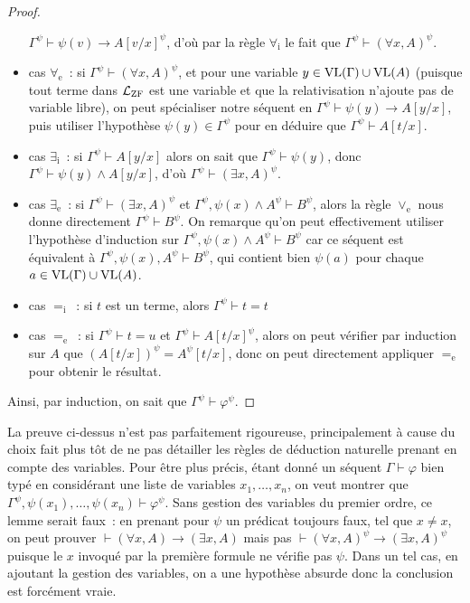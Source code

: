 \begin{proof}
\begin{itemize}
    $\Gamma^\psi\vdash \psi(v)\to A[v/x]^\psi$, d'où par la règle
    $\forall_\mathrm i$ le fait que $\Gamma^\psi \vdash (\forall x, A)^\psi$.
  \item cas $\forall_\mathrm e$~: si $\Gamma^\psi \vdash (\forall x,A)^\psi$, et
    pour une variable $y \in \operatorname{VL}(\Gamma)\cup \operatorname{VL}(A)$ (puisque tout terme dans
    $\mathcal L_{\operatorname{ZF}}$ est une variable et que la relativisation n'ajoute pas
    de variable libre), on peut spécialiser notre séquent en
    $\Gamma^\psi \vdash \psi(y)\to A[y/x]$, puis utiliser l'hypothèse
    $\psi(y)\in\Gamma^\psi$ pour en déduire que $\Gamma^\psi \vdash A[t/x]$.
  \item cas $\exists_\mathrm i$~: si $\Gamma^\psi \vdash A[y/x]$ alors on sait
    que $\Gamma^\psi\vdash \psi(y)$, donc
    $\Gamma^\psi\vdash \psi(y)\land A[y/x]$, d'où
    $\Gamma^\psi \vdash (\exists x, A)^\psi$.
  \item cas $\exists_\mathrm e$~: si $\Gamma^\psi \vdash (\exists x, A)^\psi$ et
    $\Gamma^\psi, \psi(x) \land A^\psi \vdash B^\psi$, alors la règle
    $\lor_\mathrm e$ nous donne directement $\Gamma^\psi \vdash B^\psi$. On
    remarque qu'on peut effectivement utiliser l'hypothèse d'induction sur
    $\Gamma^\psi, \psi(x)\land A^\psi\vdash B^\psi$ car ce séquent est équivalent
    à $\Gamma^\psi, \psi(x), A^\psi \vdash B^\psi$, qui contient bien $\psi(a)$
    pour chaque $a \in \operatorname{VL}(\Gamma)\cup\operatorname{VL}(A)$.
  \item cas $=_\mathrm i$~: si $t$ est un terme, alors $\Gamma^\psi\vdash t = t$
  \item cas $=_\mathrm e$~: si $\Gamma^\psi \vdash t = u$ et
    $\Gamma^\psi \vdash A[t/x]^\psi$, alors on peut vérifier par induction sur
    $A$ que $(A[t/x])^\psi = A^\psi [t/x]$, donc on peut directement appliquer
    $=_\mathrm e$ pour obtenir le résultat.
  \end{itemize}
  Ainsi, par induction, on sait que $\Gamma^\psi \vdash \varphi^\psi$.
\end{proof}

\begin{remark}
  La preuve ci-dessus n'est pas parfaitement rigoureuse, principalement à cause
  du choix fait plus tôt de ne pas détailler les règles de déduction naturelle
  prenant en compte des variables. Pour être plus précis, étant donné un séquent
  $\Gamma\vdash \varphi$ bien typé en considérant une liste de variables
  $x_1,\ldots,x_n$, on veut montrer que
  $\Gamma^\psi, \psi(x_1),\ldots,\psi(x_n) \vdash \varphi^\psi$. Sans gestion des
  variables du premier ordre, ce lemme serait faux~: en prenant pour $\psi$ un
  prédicat toujours faux, tel que $x\neq x$, on peut prouver
  $\vdash (\forall x, A)\to (\exists x, A)$ mais pas
  $\vdash (\forall x,A)^\psi \to (\exists x, A)^\psi$ puisque le $x$ invoqué par
  la première formule ne vérifie pas $\psi$. Dans un tel cas, en ajoutant la
  gestion des variables, on a une hypothèse absurde donc la conclusion est
  forcément vraie.
\end{remark}


